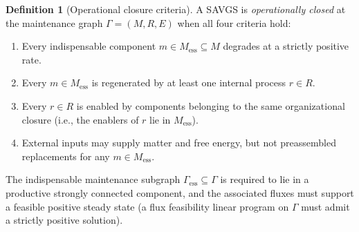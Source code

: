 \documentclass[11pt,a4paper]{article}
\theoremstyle{plain}
\theoremstyle{definition}
\newtheorem{definition}[theorem]{Definition}
\theoremstyle{remark}
\begin{document}
\begin{definition}[Operational closure criteria]
\label{def:closure-criteria}
A SAVGS is \emph{operationally closed} at the maintenance graph
$\Gamma = (M, R, E)$ when all four criteria hold:
\begin{enumerate}[leftmargin=*,itemsep=2pt]
\item Every indispensable component $m \in M_{\mathrm{ess}} \subseteq
M$ degrades at a strictly positive rate.
\item Every $m \in M_{\mathrm{ess}}$ is regenerated by at least one
internal process $r \in R$.
\item Every $r \in R$ is enabled by components belonging to the same
organizational closure (i.e., the enablers of $r$ lie in
$M_{\mathrm{ess}}$).
\item External inputs may supply matter and free energy, but not
preassembled replacements for any $m \in M_{\mathrm{ess}}$.
\end{enumerate}
The indispensable maintenance subgraph
$\Gamma_{\mathrm{ess}} \subseteq \Gamma$ is required to lie in a
productive strongly connected component, and the associated fluxes
must support a feasible positive steady state (a flux feasibility
linear program on $\Gamma$ must admit a strictly positive solution).
\end{definition}
\end{document}
